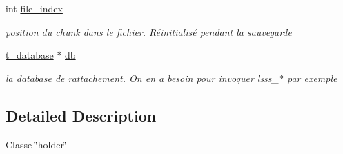 \begin{DoxyCompactItemize}
int \hyperlink{classt__holder_a3f27e169518bb716f029fa762f410167}{file\+\_\+index}
\begin{DoxyCompactList}\small\item\em position du chunk dans le fichier. Réinitialisé pendant la sauvegarde \end{DoxyCompactList}\item 
\mbox{\label{classt__holder_af80fd2f7bd7d4b66fc13f8751d8d7411}} 
\hyperlink{classt__database}{t\+\_\+database} $\ast$ \hyperlink{classt__holder_af80fd2f7bd7d4b66fc13f8751d8d7411}{db}
\begin{DoxyCompactList}\small\item\em la database de rattachement. On en a besoin pour invoquer lsss\+\_\+$\ast$ par exemple \end{DoxyCompactList}\end{DoxyCompactItemize}


\subsection{Detailed Description}
Classe \char`\"{}holder\char`\"{}

